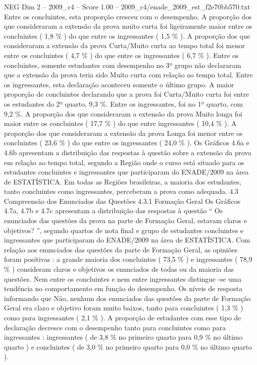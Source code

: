 \begin{textsample}{NEG Dim 2 – 2009\_c4 – Score 1.00 – 2009\_c4/enade\_2009\_est\_f2e70bb570.txt}
Entre os concluintes, esta proporção cresceu com o desempenho.
A proporção dos que consideraram a extensão da prova muito curta foi ligeiramente maior entre os concluintes ( 1,8 \% ) do que entre os ingressantes ( 1,5 \% ).
A proporção dos que consideraram a extensão da prova Curta/Muito curta ao tempo total foi menor entre os concluintes ( 4,7 \% ) do que entre os ingressantes ( 6,7 \% ).
Entre os concluintes, somente estudantes com desempenho no 3º grupo não declararam que a extensão da prova teria sido Muito curta com relação ao tempo total.
Entre os ingressantes, esta declaração aconteceu somente o último grupo.
A maior proporção de concluintes declarando que a prova foi Curta/Muito curta foi entre os estudantes do 2º quarto, 9,3 \%.
Entre os ingressantes, foi no 1º quarto, com 9,2 \%.
A proporção dos que consideraram a extensão da prova Muito longa foi maior entre os concluintes ( 17,7 \% ) do que entre ingressantes ( 10,4 \% ).
A proporção dos que consideraram a extensão da prova Longa foi menor entre os concluintes ( 23,6 \% ) do que entre os ingressantes ( 24,0 \% ).
Os Gráficos 4.6a e 4.6b apresentam a distribuição das respostas à questão sobre a extensão da prova em relação ao tempo total, segundo a Região onde o curso está situado para os estudantes concluintes e ingressantes que participaram do ENADE/2009 na área de ESTATÍSTICA.
Em todas as Regiões brasileiras, a maioria dos estudantes, tanto concluintes como ingressantes, perceberam a prova como adequada. 4.3 Compreensão dos Enunciados das Questões 4.3.1 Formação Geral Os Gráficos 4.7a, 4.7b e 4.7c apresentam a distribuição das respostas à questão “ Os enunciados das questões da prova na parte de Formação Geral, estavam claros e objetivos? ”, segundo quartos de nota final e grupo de estudantes concluintes e ingressantes que participaram do ENADE/2009 na área de ESTATÍSTICA.
Com relação aos enunciados das questões da parte de Formação Geral, as opiniões foram positivas : a grande maioria dos concluintes ( 73,5 \% ) e ingressantes ( 78,9 \% ) consideram claros e objetivos os enunciados de todas ou da maioria das questões.
Nem entre os concluintes e nem entre ingressantes distingue -se uma tendência no comportamento em função do desempenho.
Os níveis de resposta informando que Não, nenhum dos enunciados das questões da parte de Formação Geral era claro e objetivo foram muito baixos, tanto para concluintes ( 1,3 \% ) como para ingressantes ( 2,1 \% ).
A proporção de estudantes com esse tipo de declaração decresce com o desempenho tanto para concluintes como para ingressantes : ingressantes ( de 3,8 \% no primeiro quarto para 0,9 \% no último quarto ) e concluintes ( de 3,0 \% no primeiro quarto para 0,0 \% no último quarto ).

\end{textsample}
